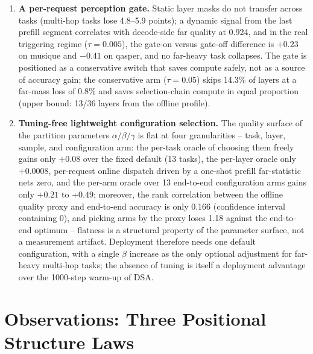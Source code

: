 \documentclass[11pt]{article}
\begin{document}
\begin{enumerate}
\item \textbf{A per-request perception gate.} Static layer masks do not transfer across tasks (multi-hop tasks lose 4.8--5.9 points); a dynamic signal from the last prefill segment correlates with decode-side far quality at 0.924, and in the real triggering regime ($\tau{=}0.005$), the gate-on versus gate-off difference is $+0.23$ on musique and $-0.41$ on qasper, and no far-heavy task collapses. The gate is positioned as a conservative switch that saves compute safely, not as a source of accuracy gain; the conservative arm ($\tau{=}0.05$) skips 14.3\% of layers at a far-mass loss of 0.8\% and saves selection-chain compute in equal proportion (upper bound: 13/36 layers from the offline profile).
\item \textbf{Tuning-free lightweight configuration selection.} The quality surface of the partition parameters $\alpha/\beta/\gamma$ is flat at four granularities -- task, layer, sample, and configuration arm: the per-task oracle of choosing them freely gains only $+0.08$ over the fixed default (13 tasks), the per-layer oracle only $+0.0008$, per-request online dispatch driven by a one-shot prefill far-statistic nets zero, and the per-arm oracle over 13 end-to-end configuration arms gains only $+0.21$ to $+0.49$; moreover, the rank correlation between the offline quality proxy and end-to-end accuracy is only 0.166 (confidence interval containing 0), and picking arms by the proxy loses 1.18 against the end-to-end optimum -- flatness is a structural property of the parameter surface, not a measurement artifact. Deployment therefore needs one default configuration, with a single $\beta$ increase as the only optional adjustment for far-heavy multi-hop tasks; the absence of tuning is itself a deployment advantage over the 1000-step warm-up of DSA.
\end{enumerate}

\section{Observations: Three Positional Structure Laws}\label{sec:obs}
\end{document}
